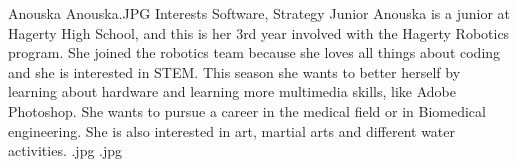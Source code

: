 \insertbio
{Anouska}
{Anouska.JPG}
{Interests}
{Software, Strategy}
{Junior}
{
Anouska is a junior at Hagerty High School, and this is her 3rd year involved with the Hagerty Robotics program. She joined the robotics team because she loves all things about coding and she is interested in STEM. This season she wants to better herself by learning about hardware and learning more multimedia skills, like Adobe Photoshop. She wants to pursue a career in the medical field or in Biomedical engineering. She is also interested in art, martial arts and different water activities. 
}
{.jpg}
{.jpg}